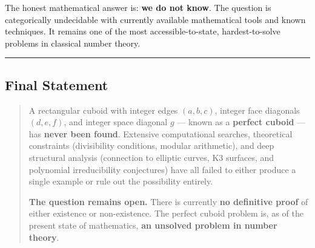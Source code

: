 \documentclass[10pt,a4paper]{article}
\begin{document}
The honest mathematical answer is: \textbf{we do not know}. The question is categorically undecidable with currently available mathematical tools and known techniques. It remains one of the most accessible-to-state, hardest-to-solve problems in classical number theory.

\begin{center}
\rule{0.5\textwidth}{0.4pt}
\end{center}

\subsection{Final Statement}

\begin{quote}
A rectangular cuboid with integer edges $(a, b, c)$, integer face diagonals $(d, e, f)$, and integer space diagonal $g$ --- known as a \textbf{perfect cuboid} --- has \textbf{never been found}. Extensive computational searches, theoretical constraints (divisibility conditions, modular arithmetic), and deep structural analysis (connection to elliptic curves, K3 surfaces, and polynomial irreducibility conjectures) have all failed to either produce a single example or rule out the possibility entirely.

\textbf{The question remains open.} There is currently \textbf{no definitive proof} of either existence or non-existence. The perfect cuboid problem is, as of the present state of mathematics, \textbf{an unsolved problem in number theory}.

\end{quote}
\end{document}
